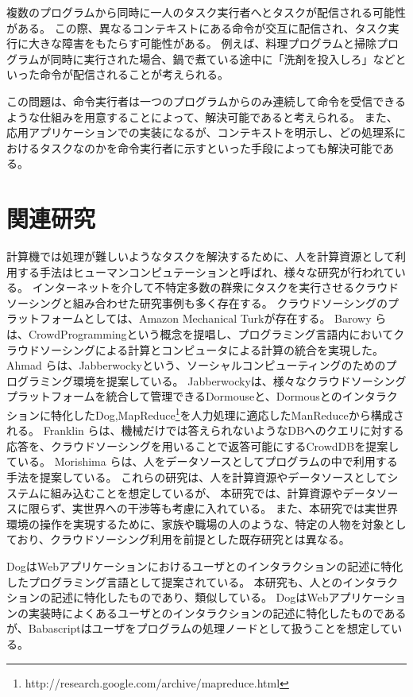 \documentclass[twoside]{wiss}
\begin{document}
複数のプログラムから同時に一人のタスク実行者へとタスクが配信される可能性がある。
この際、異なるコンテキストにある命令が交互に配信され、タスク実行に大きな障害をもたらす可能性がある。
例えば、料理プログラムと掃除プログラムが同時に実行された場合、鍋で煮ている途中に「洗剤を投入しろ」などといった命令が配信されることが考えられる。

この問題は、命令実行者は一つのプログラムからのみ連続して命令を受信できるような仕組みを用意することによって、解決可能であると考えられる。
また、応用アプリケーションでの実装になるが、コンテキストを明示し、どの処理系におけるタスクなのかを命令実行者に示すといった手段によっても解決可能である。

\section{関連研究}

計算機では処理が難しいようなタスクを解決するために、人を計算資源として利用する手法はヒューマンコンピュテーション\cite{humancomputation}と呼ばれ、様々な研究が行われている。
インターネットを介して不特定多数の群衆にタスクを実行させるクラウドソーシングと組み合わせた研究事例も多く存在する。
クラウドソーシングのプラットフォームとしては、Amazon Mechanical Turk\cite{mechanicalturk}が存在する。
Barowy らは、CrowdProgrammingという概念を提唱し、プログラミング言語内においてクラウドソーシングによる計算とコンピュータによる計算の統合を実現した\cite{automan}。
Ahmad らは、Jabberwocky\cite{jabberwocky}という、ソーシャルコンピューティングのためのプログラミング環境を提案している。
Jabberwockyは、様々なクラウドソーシングプラットフォームを統合して管理できるDormouseと、Dormousとのインタラクションに特化したDog,MapReduce\footnote{http://research.google.com/archive/mapreduce.html}を人力処理に適応したManReduceから構成される。
Franklin らは、機械だけでは答えられないようなDBへのクエリに対する応答を、クラウドソーシングを用いることで返答可能にするCrowdDBを提案している\cite{crowddb}。
Morishima らは、人をデータソースとしてプログラムの中で利用する手法を提案している\cite{cylog}。
これらの研究は、人を計算資源やデータソースとしてシステムに組み込むことを想定しているが、
本研究では、計算資源やデータソースに限らず、実世界への干渉等も考慮に入れている。
また、本研究では実世界環境の操作を実現するために、家族や職場の人のような、特定の人物を対象としており、クラウドソーシング利用を前提とした既存研究とは異なる。

Dog\cite{dog}はWebアプリケーションにおけるユーザとのインタラクションの記述に特化したプログラミング言語として提案されている。
本研究も、人とのインタラクションの記述に特化したものであり、類似している。
DogはWebアプリケーションの実装時によくあるユーザとのインタラクションの記述に特化したものであるが、Babascriptはユーザをプログラムの処理ノードとして扱うことを想定している。
\end{document}
